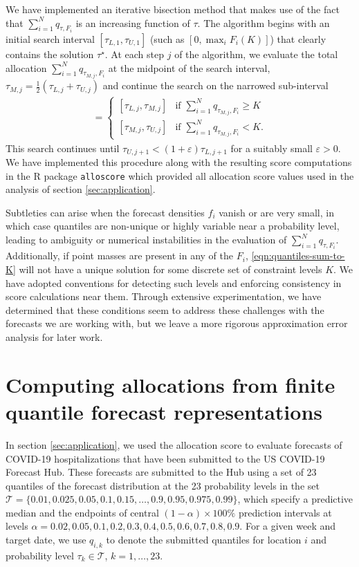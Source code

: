 \documentclass{article}\usepackage[]{graphicx}\usepackage[]{xcolor}
\begin{document}
We have implemented an iterative bisection method that makes use of the fact that $\sum_{i=1}^N q_{\tau,F_i}$ is an
increasing function of $\tau$. The algorithm begins with an initial search interval $[\tau_{L,1}, \tau_{U,1}]$ (such as
$[0,\max_{i}F_i(K)]$) that clearly contains the solution $\tau^{\star}$. At each step $j$ of the algorithm, we evaluate
the total allocation $\sum_{i=1}^N q_{\tau_{M,j},F_i}$ at the midpoint of the search interval,
$\tau_{M,j} = \frac{1}{2}(\tau_{L,j} + \tau_{U,j})$ and continue the search on the narrowed sub-interval
\begin{align}
[\tau_{L,j+1},\tau_{U,j+1}] =
\begin{cases}
[\tau_{L,j}, \tau_{M,j}] & \text{if } \sum_{i=1}^N q_{\tau_{M,j},F_i} \geq K \\
[\tau_{M,j}, \tau_{U,j}] & \text{if } \sum_{i=1}^N q_{\tau_{M,j},F_i} < K.
\end{cases} \nonumber
\end{align}
This search continues until $\tau_{U,j+1} < (1+\varepsilon)\tau_{L,j+1}$ for a suitably small $\varepsilon>0$. We have
implemented this procedure along with the resulting score computations in the R package \verb`alloscore`
\citep{gerding-alloscore} which provided all allocation score values used in the analysis of section
\ref{sec:application}.

Subtleties can arise when the forecast densities $f_i$ vanish or are very small, in which case quantiles are non-unique
or highly variable near a probability level, leading to ambiguity or numerical instabilities{} in the evaluation of
$\sum_{i=1}^N q_{\tau,F_i}$. Additionally, if point masses are present in any of the $F_i$,
\eqref{eqn:quantiles-sum-to-K} will not have a unique solution for some discrete set of constraint levels $K$. We have
adopted conventions for detecting such levels and enforcing consistency in score calculations near them. Through
extensive experimentation, we have determined that these conditions seem to address these challenges with the forecasts
we are working with, but we leave a more rigorous approximation error analysis for later work.

\section{Computing allocations from finite quantile forecast representations}
\label{sec:distfromq}

In section \ref{sec:application}, we used the allocation score to evaluate forecasts of COVID-19
hospitalizations that have been submitted to the US COVID-19 Forecast Hub. These forecasts are submitted to the Hub
using a set of 23 quantiles of the forecast distribution at the 23 probability levels in the set $\mathcal{T} = \{0.01,
0.025, 0.05, 0.1, 0.15, \ldots, \allowbreak 0.9, 0.95, 0.975, 0.99\}$, which specify a predictive median and the
endpoints of central $(1 - \alpha) \times 100\%$ prediction intervals at levels $\alpha = 0.02, 0.05, 0.1, 0.2,
\allowbreak 0.3, 0.4, 0.5, 0.6, \allowbreak 0.7, 0.8, 0.9$. For a given week and target date, we use $q_{i,k}$ to denote
the submitted quantiles for location $i$ and probability level $\tau_k \in \mathcal{T}$, $k = 1, \ldots, 23$.
\end{document}
